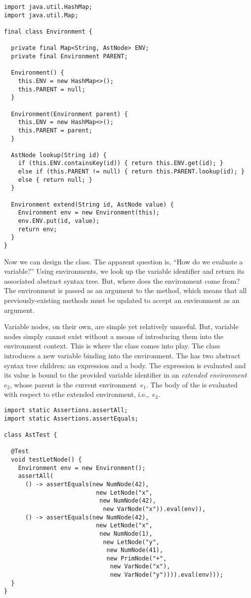 \begin{lstlisting}[language=MyJava]
import java.util.HashMap;
import java.util.Map;

final class Environment {

  private final Map<String, AstNode> ENV;
  private final Environment PARENT;

  Environment() { 
    this.ENV = new HashMap<>(); 
    this.PARENT = null; 
  }

  Environment(Environment parent) { 
    this.ENV = new HashMap<>(); 
    this.PARENT = parent; 
  }

  AstNode lookup(String id) {
    if (this.ENV.containsKey(id)) { return this.ENV.get(id); }
    else if (this.PARENT != null) { return this.PARENT.lookup(id); }
    else { return null; }
  }

  Environment extend(String id, AstNode value) {
    Environment env = new Environment(this);
    env.ENV.put(id, value);
    return env;
  }
}
\end{lstlisting}

Now we can design the  class. The apparent question is, ``How do we evaluate a variable?'' Using environments, we look up the variable identifier and return its associated abstract syntax tree. But, where does the environment come from? The environment is passed as an argument to the  method, which means that all previously-existing  methods must be updated to accept an environment as an argument.

Variable nodes, on their own, are simple yet relatively unuseful. But, variable nodes simply cannot exist without a means of introducing them into the environment context. This is where the  class comes into play. The  class introduces a new variable binding into the environment. The  has two abstract syntax tree children: an expression and a body. The expression is evaluated and its value is bound to the provided variable identifier in an \emph{extended environment} $e_2$, whose parent is the current environment~$e_1$. The body of the  is evaluated with respect to ethe extended environment, i.e.,~$e_2$.

\begin{lstlisting}[language=MyJava]
import static Assertions.assertAll;
import static Assertions.assertEquals;

class AstTest {

  @Test
  void testLetNode() {
    Environment env = new Environment();
    assertAll(
      () -> assertEquals(new NumNode(42),
                          new LetNode("x", 
                           new NumNode(42),
                            new VarNode("x")).eval(env)),
      () -> assertEquals(new NumNode(42),
                          new LetNode("x", 
                           new NumNode(1),
                            new LetNode("y", 
                             new NumNode(41),
                             new PrimNode("+", 
                              new VarNode("x"), 
                              new VarNode("y")))).eval(env)));
  }
}
\end{lstlisting}

